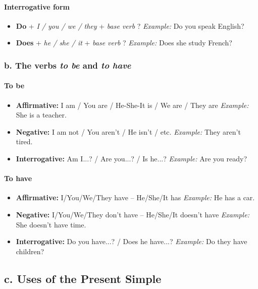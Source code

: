 \documentclass[11pt,a4paper]{article}
\begin{document}
\paragraph{Interrogative form}
\begin{itemize}
  \item \textbf{Do} + \textit{I / you / we / they} + \textit{base verb} ?  
  \textit{Example:} Do you speak English?
  \item \textbf{Does} + \textit{he / she / it} + \textit{base verb} ?  
  \textit{Example:} Does she study French?
\end{itemize}

\subsubsection*{b. The verbs \textit{to be} and \textit{to have}}

\paragraph{To be}
\begin{itemize}
  \item \textbf{Affirmative:} I am / You are / He-She-It is / We are / They are  
  \textit{Example:} She is a teacher.
  \item \textbf{Negative:} I am not / You aren’t / He isn’t / etc.  
  \textit{Example:} They aren’t tired.
  \item \textbf{Interrogative:} Am I...? / Are you...? / Is he...?  
  \textit{Example:} Are you ready?
\end{itemize}

\paragraph{To have}
\begin{itemize}
  \item \textbf{Affirmative:} I/You/We/They have – He/She/It has  
  \textit{Example:} He has a car.
  \item \textbf{Negative:} I/You/We/They don’t have – He/She/It doesn’t have  
  \textit{Example:} She doesn’t have time.
  \item \textbf{Interrogative:} Do you have...? / Does he have...?  
  \textit{Example:} Do they have children?
\end{itemize}

\subsection*{c. Uses of the Present Simple}
\end{document}
